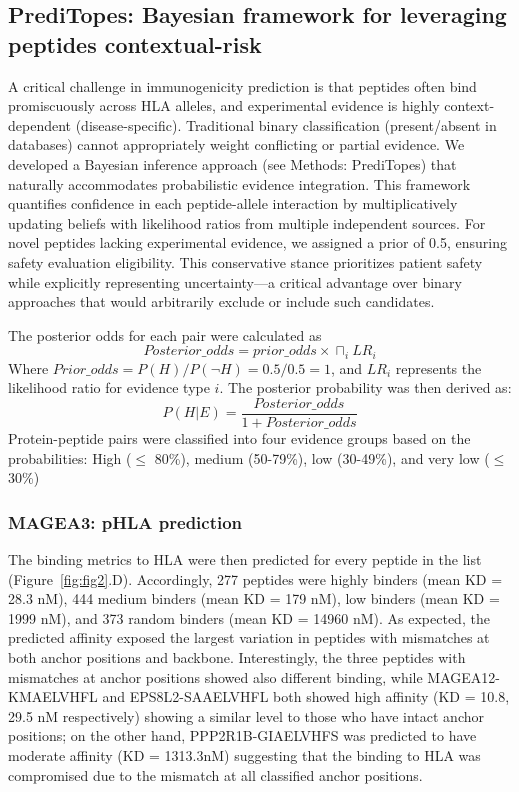 \documentclass[unnumsec,webpdf,contemporary,large]{oup-authoring-template}%
\theoremstyle{thmstyleone}%
\theoremstyle{thmstyletwo}%
\theoremstyle{thmstylethree}%
\begin{document}
    \subsection{\textbf{PrediTopes: Bayesian framework for leveraging peptides contextual-risk}}
        A critical challenge in immunogenicity prediction is that peptides often bind promiscuously across HLA alleles, and experimental evidence is highly context-dependent (disease-specific). Traditional binary classification (present/absent in databases) cannot appropriately weight conflicting or partial evidence.
        We developed a Bayesian inference approach (see Methods: PrediTopes) that naturally accommodates probabilistic evidence integration. This framework quantifies confidence in each peptide-allele interaction by multiplicatively updating beliefs with likelihood ratios from multiple independent sources. For novel peptides lacking experimental evidence, we assigned a prior of 0.5, ensuring safety evaluation eligibility. This conservative stance prioritizes patient safety while explicitly representing uncertainty—a critical advantage over binary approaches that would arbitrarily exclude or include such candidates.
        
        The posterior odds for each pair were calculated as 
        \begin{equation}
            Posterior\_odds= prior\_odds \times \sqcap_i LR_i
        \end{equation}
        Where $Prior\_odds=P(H)/P(\neg H) =0.5/0.5=1$, and $LR_i$ represents the likelihood ratio for evidence type $i$. The posterior probability was then derived as:
        \begin{equation}
            P(H|E)=\frac{Posterior\_odds}{1+Posterior\_odds}
        \end{equation}
        Protein-peptide pairs were classified into four evidence groups based on the probabilities: High ($\leq$ 80\%), medium (50-79\%), low (30-49\%), and very low ($\leq$ 30\%)  
        
        \subsubsection{\textbf{MAGEA3: pHLA prediction}}
            The binding metrics to HLA were then predicted for every peptide in the list (Figure~\ref{fig:fig2}.D). Accordingly, 277 peptides were highly binders (mean KD = 28.3 nM), 444 medium binders (mean KD = 179 nM), low binders (mean KD = 1999 nM), and 373 random binders (mean KD = 14960 nM). As expected, the predicted affinity exposed the largest variation in peptides with mismatches at both anchor positions and backbone. Interestingly, the three peptides with mismatches at anchor positions showed also different binding, while MAGEA12-KMAELVHFL and EPS8L2-SAAELVHFL both showed high affinity (KD = 10.8, 29.5 nM respectively) showing a similar level to those who have intact anchor positions; on the other hand, PPP2R1B-GIAELVHFS was predicted to have moderate affinity (KD = 1313.3nM) suggesting that the binding to HLA was compromised due to the mismatch at all classified anchor positions.
\end{document}

